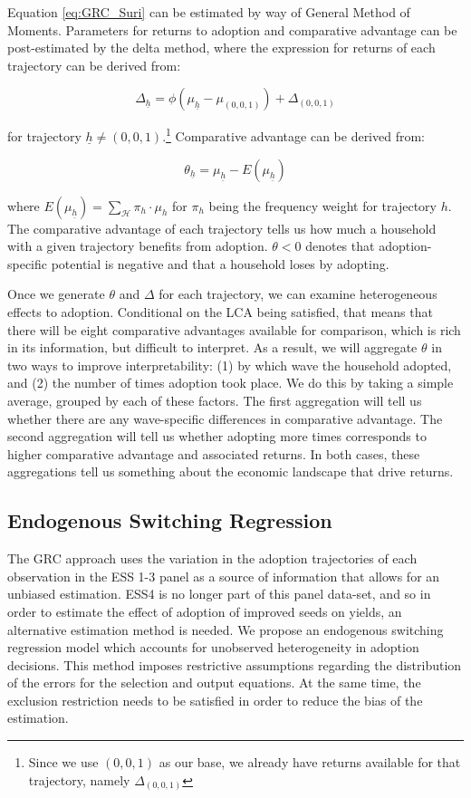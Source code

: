 \documentclass[11pt]{article}
\begin{document}
Equation \ref{eq:GRC_Suri} can be estimated by way of General Method of Moments. Parameters for returns to adoption and comparative advantage can be post-estimated by the delta method, where the expression for returns of each trajectory can be derived from:

$$
\Delta_{\underline{h}}=\phi\left(\mu_{\underline{h}}-\mu_{(0,0,1)}\right) + \Delta_{(0,0,1)}
$$

for trajectory $\underline{h} \neq (0,0,1)$.\footnote{Since we use $(0,0,1)$ as our base, we already have returns available for that trajectory, namely $\Delta_{(0,0,1)}$} Comparative advantage can be derived from:

$$
\theta_{\underline{h}} = \mu_{\underline{h}} - E(\mu_{\underline{h}})
$$

where $E(\mu_{\underline{h}}) = \sum_{\mathcal{H}} \pi_h \cdot \mu_h$ for $\pi_h$ being the frequency weight for trajectory $h$. The comparative advantage of each trajectory tells us how much a household with a given trajectory benefits from adoption. $\theta <0 $ denotes that adoption-specific potential is negative and that a household loses by adopting.

Once we generate $\theta$ and $\Delta$ for each trajectory, we can examine heterogeneous effects to adoption. Conditional on the LCA being satisfied, that means that there will be eight comparative advantages available for comparison, which is rich in its information, but difficult to interpret. As a result, we will aggregate $\theta$ in two ways to improve interpretability: (1) by which wave the household adopted, and (2) the number of times adoption took place. We do this by taking a simple average, grouped by each of these factors. The first aggregation will tell us whether there are any wave-specific differences in comparative advantage. The second aggregation will tell us whether adopting more times corresponds to higher comparative advantage and associated returns. In both cases, these aggregations tell us something about the economic landscape that drive returns.

\subsection{Endogenous Switching Regression}

The GRC approach uses the variation in the adoption trajectories of each observation in the ESS 1-3 panel as a source of information that allows for an unbiased estimation. ESS4 is no longer part of this panel data-set, and so in order to estimate the effect of adoption of improved seeds on yields, an alternative estimation method is needed. We propose an endogenous switching regression model which accounts for unobserved heterogeneity in adoption decisions. This method imposes restrictive assumptions regarding the distribution of the errors for the selection and output equations. At the same time, the exclusion restriction needs to be satisfied in order to reduce the bias of the estimation. 
\end{document}
